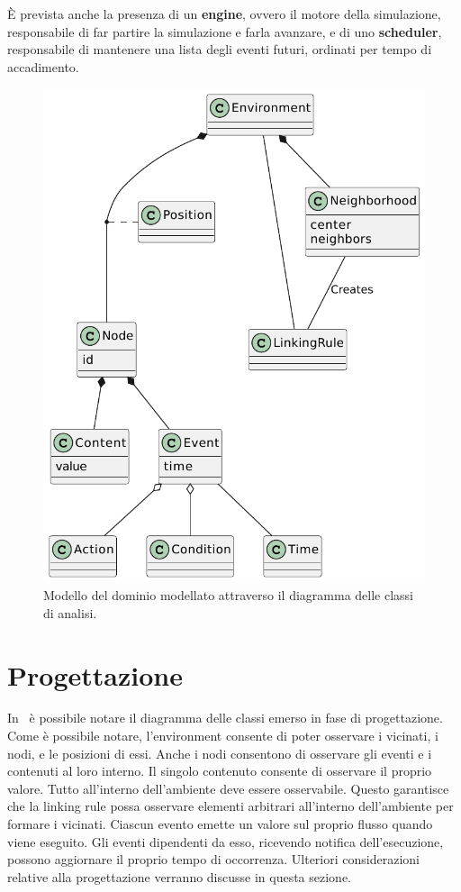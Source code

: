 \documentclass[12pt,a4paper,openright,twoside]{book}
\begin{document}
È prevista anche la presenza di un \textbf{engine}, ovvero il motore della simulazione, responsabile di far partire la simulazione e farla avanzare, e di uno \textbf{scheduler}, responsabile di mantenere una lista degli eventi futuri, ordinati per tempo di accadimento. 

\begin{figure}
    \centering
    \includegraphics[width=\linewidth]{figures/analysis/domain-model.pdf}
    \caption{Modello del dominio modellato attraverso il diagramma delle classi di analisi.}
    \label{fig:analysis-class-diagram}
\end{figure}


\section{Progettazione}
\label{sec:progettazione}
In~ è possibile notare il diagramma delle classi emerso in fase di progettazione. Come è possibile notare, l'environment consente di poter osservare i vicinati, i nodi, e le posizioni di essi. Anche i nodi consentono di osservare gli eventi e i contenuti al loro interno. Il singolo contenuto consente di osservare il proprio valore. Tutto all'interno dell'ambiente deve essere osservabile. Questo garantisce che la linking rule possa osservare elementi arbitrari all'interno dell'ambiente per formare i vicinati. 
Ciascun evento emette un valore sul proprio flusso quando viene eseguito. Gli eventi dipendenti da esso, ricevendo notifica dell'esecuzione, possono aggiornare il proprio tempo di occorrenza. 
Ulteriori considerazioni relative alla progettazione verranno discusse in questa sezione. 
\end{document}
